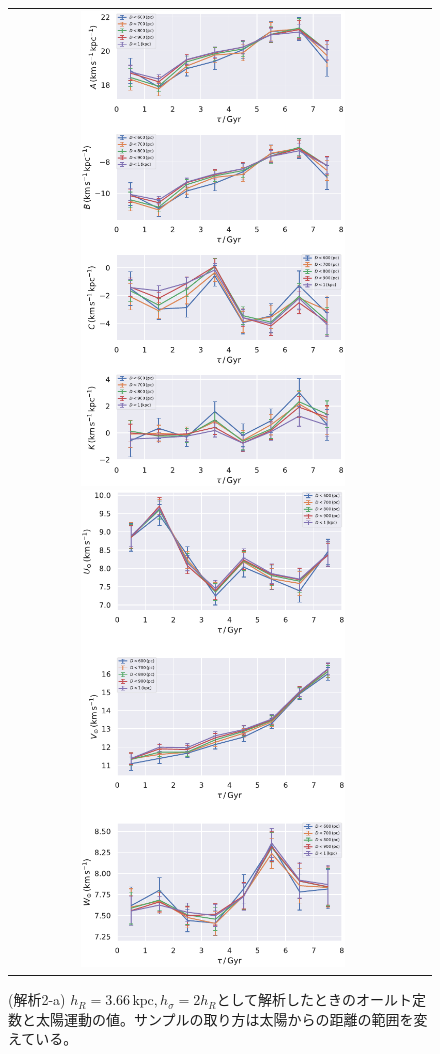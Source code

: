 \begin{figure}[htbp]
   \centering
\begin{tabular}{cc}
\includegraphics[width=7cm]{fig/ABCK_2a.pdf}
\includegraphics[width=7cm]{fig/UVW_2a.pdf}
\end{tabular}
    \caption{(解析2-a) $h_R=3.66\,\mathrm{kpc}, h_{\sigma}=2h_R$として解析したときのオールト定数と太陽運動の値。サンプルの取り方は太陽からの距離の範囲を変えている。}
    \label{figObs2a}
\end{figure}

